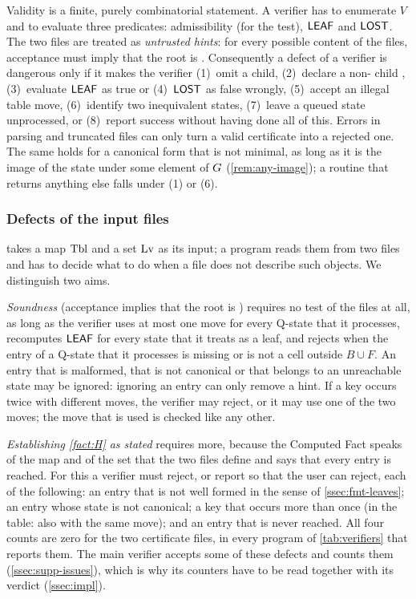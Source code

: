 Validity is a finite, purely combinatorial statement. A verifier has to enumerate $V$ and to evaluate
three predicates: admissibility (for the \VOID{} test), $\mathsf{LEAF}$ and $\mathsf{LOST}$. The two files are treated as
\emph{untrusted hints}: for every possible content of the files, acceptance must imply that the root is
\WON. Consequently a defect of a verifier is dangerous only if it makes the verifier (1)~omit a child,
(2)~declare a non-\VOID{} child \VOID, (3)~evaluate $\mathsf{LEAF}$ as true or (4)~$\mathsf{LOST}$ as false wrongly,
(5)~accept an illegal table move, (6)~identify two inequivalent states, (7)~leave a queued state
unprocessed, or (8)~report success without having done all of this. Errors in parsing and truncated files can only
turn a valid certificate into a rejected one. The same holds for a canonical form that is not minimal, as
long as it is the image of the state under some element of $G$ (\cref{rem:any-image}); a routine that
returns anything else falls under (1) or (6).

\subsubsection*{Defects of the input files}
 takes a map $\mathrm{Tbl}$ and a set $\mathrm{Lv}$ as its input; a program reads them from two files
and has to decide what to do when a file does not describe such objects. We distinguish two aims.

\emph{Soundness} (acceptance implies that the root is \WON) requires no test of the files at all, as long
as the verifier uses at most one move for every Q-state that it processes, recomputes $\mathsf{LEAF}$ for every
state that it treats as a leaf, and rejects when the entry of a Q-state that it processes is missing or is
not a cell outside $B\cup F$. An entry that is malformed, that is not canonical or that belongs to an
unreachable state may be ignored: ignoring an entry can only remove a hint. If a key occurs twice with
different moves, the verifier may reject, or it may use one of the two moves; the move that is used is
checked like any other.

\emph{Establishing \cref{fact:H} as stated} requires more, because the Computed Fact speaks of the map
and of the set that the two files define and says that every entry is reached. For this a verifier must
reject, or report so that the user can reject, each of the following: an entry that is not well formed in
the sense of \cref{ssec:fmt-leaves}; an entry whose state is not canonical; a key that occurs more than once
(in the table: also with the same move); and an entry that is never reached. All four counts are zero
for the two certificate files, in every program of \cref{tab:verifiers} that reports them. The main
verifier accepts some of these defects and counts them (\cref{ssec:supp-issues}), which is why its counters
have to be read together with its verdict (\cref{ssec:impl}).

